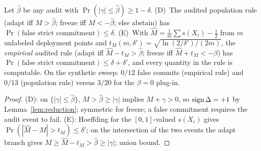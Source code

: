 \begin{theorem}\label{thm:short-audDE}\label{thm:aud-DE}
Let $\widehat\beta$ be any audit with $\Pr(|\gamma|\le\widehat\beta)\ge1-\delta$.
\textup{(D)}~The audited population rule (adapt iff $M>\widehat\beta$; freeze iff
$M<-\widehat\beta$; else abstain) has $\Pr(\text{false strict commitment})\le\delta$.
\textup{(E)}~With $\widehat M=\tfrac1m\sum s(X_i)-\tfrac12$ from $m$ unlabeled deployment
points and $t_M(m,\delta')=\sqrt{\ln(2/\delta')/(2m)}$, the \emph{empirical} audited rule
(adapt iff $\widehat M-t_M>\widehat\beta$; freeze iff $\widehat M+t_M<-\widehat\beta$) has
$\Pr(\text{false strict commitment})\le\delta+\delta'$, and every quantity in the rule is
computable. On the synthetic sweep: $0/12$ false commits (empirical rule) and $0/13$
(population rule) versus $3/20$ for the $\beta{=}0$ plug-in.
\end{theorem}
\begin{proof}
\textup{(D)}: on $\{|\gamma|\le\widehat\beta\}$, $M>\widehat\beta\ge|\gamma|$ implies
$M+\gamma>0$, so $\operatorname{sign}\Delta=+1$ by Lemma~\ref{lem:reduction}; symmetric for freeze; a false
commitment requires the audit event to fail.
\textup{(E)}: Hoeffding for the $[0,1]$-valued $s(X_i)$ gives
$\Pr(|\widehat M-M|>t_M)\le\delta'$; on the intersection of the two events the adapt branch gives
$M\ge\widehat M-t_M>\widehat\beta\ge|\gamma|$; union bound.
\end{proof}

